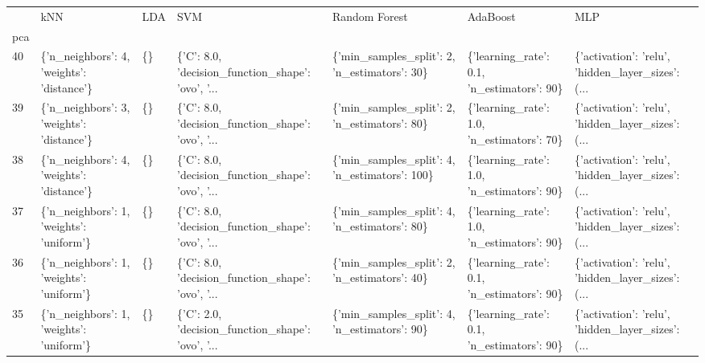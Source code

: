 \begin{tabular}{lllllll}
\toprule
{} &                                        kNN & LDA &                                                SVM &                                  Random Forest &                                     AdaBoost &                                                MLP \\
pca &                                            &     &                                                    &                                                &                                              &                                                    \\
\midrule
40  &  \{'n\_neighbors': 4, 'weights': 'distance'\} &  \{\} &  \{'C': 8.0, 'decision\_function\_shape': 'ovo', '... &   \{'min\_samples\_split': 2, 'n\_estimators': 30\} &   \{'learning\_rate': 0.1, 'n\_estimators': 90\} &  \{'activation': 'relu', 'hidden\_layer\_sizes': (... \\
39  &  \{'n\_neighbors': 3, 'weights': 'distance'\} &  \{\} &  \{'C': 8.0, 'decision\_function\_shape': 'ovo', '... &   \{'min\_samples\_split': 2, 'n\_estimators': 80\} &   \{'learning\_rate': 1.0, 'n\_estimators': 70\} &  \{'activation': 'relu', 'hidden\_layer\_sizes': (... \\
38  &  \{'n\_neighbors': 4, 'weights': 'distance'\} &  \{\} &  \{'C': 8.0, 'decision\_function\_shape': 'ovo', '... &  \{'min\_samples\_split': 4, 'n\_estimators': 100\} &   \{'learning\_rate': 1.0, 'n\_estimators': 90\} &  \{'activation': 'relu', 'hidden\_layer\_sizes': (... \\
37  &   \{'n\_neighbors': 1, 'weights': 'uniform'\} &  \{\} &  \{'C': 8.0, 'decision\_function\_shape': 'ovo', '... &   \{'min\_samples\_split': 4, 'n\_estimators': 80\} &   \{'learning\_rate': 1.0, 'n\_estimators': 90\} &  \{'activation': 'relu', 'hidden\_layer\_sizes': (... \\
36  &   \{'n\_neighbors': 1, 'weights': 'uniform'\} &  \{\} &  \{'C': 8.0, 'decision\_function\_shape': 'ovo', '... &   \{'min\_samples\_split': 2, 'n\_estimators': 40\} &   \{'learning\_rate': 0.1, 'n\_estimators': 90\} &  \{'activation': 'relu', 'hidden\_layer\_sizes': (... \\
35  &   \{'n\_neighbors': 1, 'weights': 'uniform'\} &  \{\} &  \{'C': 2.0, 'decision\_function\_shape': 'ovo', '... &   \{'min\_samples\_split': 4, 'n\_estimators': 90\} &   \{'learning\_rate': 0.1, 'n\_estimators': 90\} &  \{'activation': 'relu', 'hidden\_layer\_sizes': (... \\

\end{tabular}
